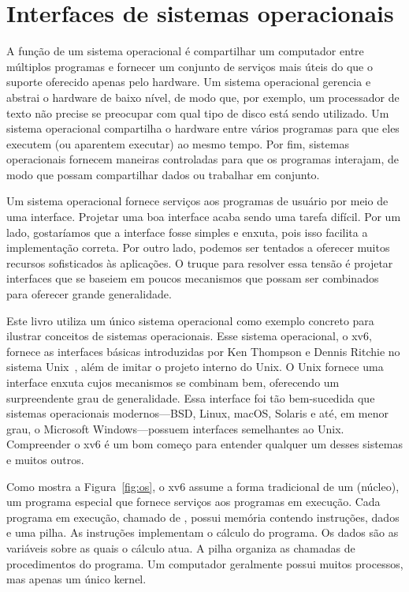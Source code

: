 \chapter{Interfaces de sistemas operacionais}
\label{CH:UNIX}

A função de um sistema operacional é compartilhar um computador entre
múltiplos programas e fornecer um conjunto de serviços mais úteis
do que o suporte oferecido apenas pelo hardware.
Um sistema operacional gerencia e abstrai
o hardware de baixo nível, de modo que, por exemplo,
um processador de texto não precise se preocupar com qual tipo
de disco está sendo utilizado.
Um sistema operacional compartilha o hardware entre vários programas para que
eles executem (ou aparentem executar) ao mesmo tempo.
Por fim, sistemas operacionais fornecem maneiras controladas para que os programas
interajam, de modo que possam compartilhar dados ou trabalhar em conjunto.

Um sistema operacional fornece serviços aos programas de usuário por meio de uma interface.
Projetar uma boa interface acaba sendo
uma tarefa difícil. Por um lado, gostaríamos que a interface fosse
simples e enxuta, pois isso facilita a implementação correta.
Por outro lado,
podemos ser tentados a oferecer muitos recursos sofisticados às aplicações.
O truque para resolver essa tensão é projetar interfaces que se baseiem em poucos
mecanismos que possam ser combinados para oferecer grande generalidade.

Este livro utiliza um único sistema operacional como exemplo concreto para
ilustrar conceitos de sistemas operacionais. Esse sistema operacional,
o xv6, fornece as interfaces básicas introduzidas por Ken Thompson e
Dennis Ritchie no sistema Unix~\cite{unix}, além de imitar o projeto interno do Unix.
O Unix fornece uma
interface enxuta cujos mecanismos se combinam bem, oferecendo um surpreendente
grau de generalidade. Essa interface foi tão bem-sucedida que
sistemas operacionais modernos—BSD, Linux, macOS, Solaris e até, em menor grau,
o Microsoft Windows—possuem interfaces semelhantes ao Unix.
Compreender o xv6 é um bom começo para entender qualquer um desses
sistemas e muitos outros.

Como mostra a 
Figura~\ref{fig:os},
o xv6 assume a forma tradicional de um
 (núcleo),
um programa especial que fornece
serviços aos programas em execução.
Cada programa em execução, chamado de
,
possui memória contendo instruções, dados e uma pilha. As
instruções implementam o
cálculo do programa. Os dados são as variáveis sobre as quais
o cálculo atua. A pilha organiza as chamadas de procedimentos do programa.
Um computador geralmente possui muitos processos, mas apenas um único
kernel.

